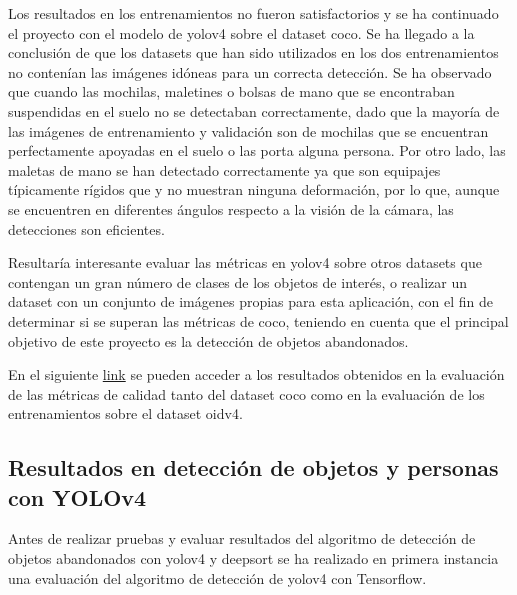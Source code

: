 Los resultados en los entrenamientos no fueron satisfactorios y se ha continuado el proyecto con el modelo de \gls{yolov4} sobre el dataset \gls{coco}. Se ha llegado a la conclusión de que los datasets que han sido utilizados en los dos entrenamientos no contenían las imágenes idóneas para un correcta detección. Se ha observado que cuando las mochilas, maletines o bolsas de mano que se encontraban suspendidas en el suelo no se detectaban correctamente, dado que la mayoría de las imágenes de entrenamiento y validación son de mochilas que se encuentran perfectamente apoyadas en el suelo o las porta alguna persona. Por otro lado, las maletas de mano se han detectado correctamente ya que son equipajes típicamente rígidos que y no muestran ninguna deformación, por lo que, aunque se encuentren en diferentes ángulos respecto a la visión de la cámara, las detecciones son eficientes.

Resultaría interesante evaluar las métricas en \gls{yolov4} sobre otros datasets que contengan un gran número de clases de los objetos de interés, o realizar un dataset con un conjunto de imágenes propias para esta aplicación, con el fin de determinar si se superan las métricas de \gls{coco}, teniendo en cuenta que el principal objetivo de este proyecto es la detección de objetos abandonados.

En el siguiente \href{https://drive.google.com/drive/folders/1ahdsjoDRICqDNB4dPGVYI6mVtYSDvvgu?usp=sharing}{link} se pueden acceder a los resultados obtenidos en la evaluación de las métricas de calidad tanto del dataset \gls{coco} como en la evaluación de los entrenamientos sobre el dataset \gls{oidv4}.

\subsection{Resultados en detección de objetos y personas con YOLOv4}
\label{subsec:resultados-yolov4-tf}

Antes de realizar pruebas y evaluar resultados del algoritmo de detección de objetos abandonados con \gls{yolov4} y \gls{deepsort} se ha realizado en primera instancia una evaluación del algoritmo de detección de \gls{yolov4} con Tensorflow.

